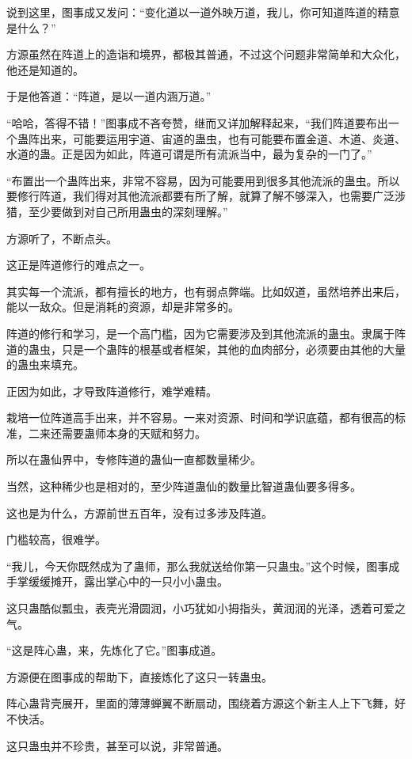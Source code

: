 \begin{this_body}
说到这里，图事成又发问：“变化道以一道外映万道，我儿，你可知道阵道的精意是什么？”

方源虽然在阵道上的造诣和境界，都极其普通，不过这个问题非常简单和大众化，他还是知道的。

于是他答道：“阵道，是以一道内涵万道。”

“哈哈，答得不错！”图事成不吝夸赞，继而又详加解释起来，“我们阵道要布出一个蛊阵出来，可能要运用宇道、宙道的蛊虫，也有可能要布置金道、木道、炎道、水道的蛊。正是因为如此，阵道可谓是所有流派当中，最为复杂的一门了。”

“布置出一个蛊阵出来，非常不容易，因为可能要用到很多其他流派的蛊虫。所以要修行阵道，我们得对其他流派都要有所了解，就算了解不够深入，也需要广泛涉猎，至少要做到对自己所用蛊虫的深刻理解。”

方源听了，不断点头。

这正是阵道修行的难点之一。

其实每一个流派，都有擅长的地方，也有弱点弊端。比如奴道，虽然培养出来后，能以一敌众。但是消耗的资源，却是非常多的。

阵道的修行和学习，是一个高门槛，因为它需要涉及到其他流派的蛊虫。隶属于阵道的蛊虫，只是一个蛊阵的根基或者框架，其他的血肉部分，必须要由其他的大量的蛊虫来填充。

正因为如此，才导致阵道修行，难学难精。

栽培一位阵道高手出来，并不容易。一来对资源、时间和学识底蕴，都有很高的标准，二来还需要蛊师本身的天赋和努力。

所以在蛊仙界中，专修阵道的蛊仙一直都数量稀少。

当然，这种稀少也是相对的，至少阵道蛊仙的数量比智道蛊仙要多得多。

这也是为什么，方源前世五百年，没有过多涉及阵道。

门槛较高，很难学。

“我儿，今天你既然成为了蛊师，那么我就送给你第一只蛊虫。”这个时候，图事成手掌缓缓摊开，露出掌心中的一只小小蛊虫。

这只蛊酷似瓢虫，表壳光滑圆润，小巧犹如小拇指头，黄润润的光泽，透着可爱之气。

“这是阵心蛊，来，先炼化了它。”图事成道。

方源便在图事成的帮助下，直接炼化了这只一转蛊虫。

阵心蛊背壳展开，里面的薄薄蝉翼不断扇动，围绕着方源这个新主人上下飞舞，好不快活。

这只蛊虫并不珍贵，甚至可以说，非常普通。


\end{this_body}
